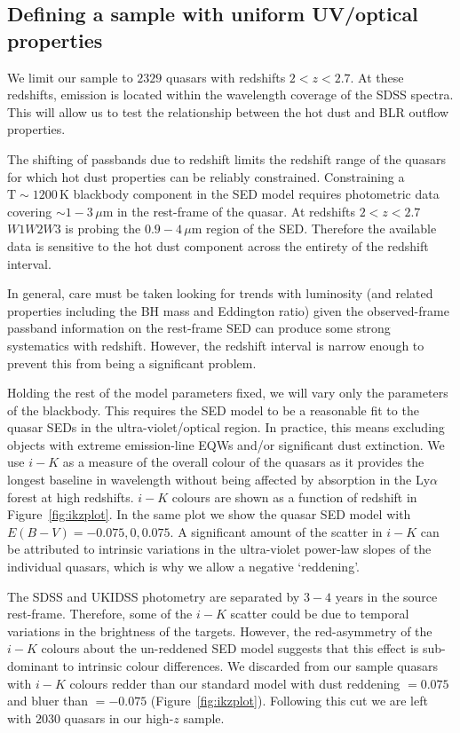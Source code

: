 \subsection{Defining a sample with uniform UV/optical properties}
\label{sec:ch5-hotdustsample}

We limit our sample to $2329$ quasars with redshifts $2 < z < 2.7$. 
At these redshifts,  emission is located within the wavelength coverage of the SDSS spectra.
This will allow us to test the relationship between the hot dust and BLR outflow properties. 

The shifting of passbands due to redshift limits the redshift range of the quasars for which hot dust properties can be reliably constrained.
Constraining a ${\mathrm T}\sim1200$\,K blackbody component in the SED model requires photometric data covering $\sim1-3$\,$\mu$m in the rest-frame of the quasar. 
At redshifts $2 < z < 2.7$ $W1W2W3$ is probing the $0.9-4$\,$\mu$m region of the SED. 
Therefore the available data is sensitive to the hot dust component across the entirety of the redshift interval. 

In general, care must be taken looking for trends with luminosity (and related properties including the BH mass and Eddington ratio) given the observed-frame passband information on the rest-frame SED can produce some strong systematics with redshift.
However, the redshift interval is narrow enough to prevent this from being a significant problem. 

Holding the rest of the model parameters fixed, we will vary only the parameters of the blackbody. 
This requires the SED model to be a reasonable fit to the quasar SEDs in the ultra-violet/optical region. 
In practice, this means excluding objects with extreme emission-line EQWs and/or significant dust extinction.
We use $i-K$ as a measure of the overall colour of the quasars as it provides the longest baseline in wavelength without being affected by absorption in the Ly$\alpha$ forest at high redshifts. 
$i-K$ colours are shown as a function of redshift in Figure~\ref{fig:ikzplot}.
In the same plot we show the quasar SED model with $E(B-V)=-0.075,0,0.075$. 
A significant amount of the scatter in $i-K$ can be attributed to intrinsic variations in the ultra-violet power-law slopes of the individual quasars, which is why we allow a negative `reddening'. 

The SDSS and UKIDSS photometry are separated by $3-4$ years in the source rest-frame. 
Therefore, some of the $i-K$ scatter could be due to temporal variations in the brightness of the targets. 
However, the red-asymmetry of the $i-K$ colours about the un-reddened SED model suggests that this effect is sub-dominant to intrinsic colour differences. 
We discarded from our sample quasars with $i - K$ colours redder than our standard model with dust reddening \ebv $= 0.075$ and bluer than \ebv $=-0.075$ (Figure~\ref{fig:ikzplot}). 
Following this cut we are left with $2030$ quasars in our high-$z$ sample. 

